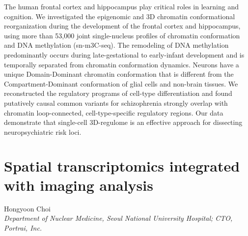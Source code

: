 \noindent
The human frontal cortex and hippocampus play critical roles in learning and cognition. We investigated the epigenomic and 3D chromatin conformational reorganization during the development of the frontal cortex and hippocampus, using more than 53,000 joint single-nucleus profiles of chromatin conformation and DNA methylation (sn-m3C-seq). The remodeling of DNA methylation predominantly occurs during late-gestational to early-infant development and is temporally separated from chromatin conformation dynamics. Neurons have a unique Domain-Dominant chromatin conformation that is different from the Compartment-Dominant conformation of glial cells and non-brain tissues. We reconstructed the regulatory programs of cell-type differentiation and found putatively causal common variants for schizophrenia strongly overlap with chromatin loop-connected, cell-type-specific regulatory regions. Our data demonstrate that single-cell 3D-regulome is an effective approach for dissecting neuropsychiatric risk loci.
\newpage

\section*{Spatial transcriptomics integrated with imaging analysis}

\begin{center}
Hongyoon Choi \\
\vspace{0.2cm}
\textit{Department of Nuclear Medicine, Seoul National University Hospital; CTO, Portrai, Inc.} \\
\end{center}

